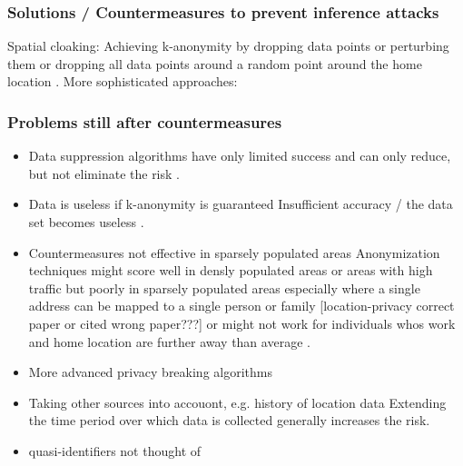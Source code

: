 \subsubsection{Solutions / Countermeasures to prevent inference attacks}
Spatial cloaking: Achieving k-anonymity by dropping data points or perturbing them or dropping all data points around a random point around the home location \parencite{krumm}.
More sophisticated approaches: \parencite{time-to-confusion}

\subsubsection{Problems still after countermeasures}
\begin{itemize}
	\item Data suppression algorithms have only limited success and can only reduce, but not eliminate the risk \parencite{hoh2006enhancing}.

\item{Data is useless if k-anonymity is guaranteed}
Insufficient accuracy / the data set becomes useless \parencite{krumm, cellphone, k-anonymity-old, k-anonymity, k-anonymity-achieving}.

\item{Countermeasures not effective in sparsely populated areas}
Anonymization techniques might score well in densly populated areas or areas with high traffic but poorly in sparsely populated areas especially where a single address can be mapped to a single person or family \parencite{time-to-confusion, location-privacy, hoh2006enhancing} [location-privacy correct paper or cited wrong paper???] or might not work for individuals whos work and home location are further away than average \parencite{privacy-home-work-pairs}.

	\item More advanced privacy breaking algorithms
\item Taking other sources into accouont, e.g. history of location data
Extending the time period over which data is collected generally increases the risk.

\item quasi-identifiers not thought of
\end{itemize}

